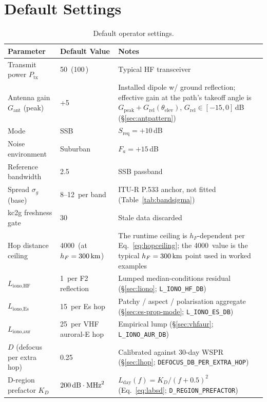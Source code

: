 \documentclass[11pt,a4paper]{article}
\newcommand{\SI}[2]{#1\,\text{#2}}
\newcommand{\si}[1]{\text{#1}}
\newcommand{\dB}{\text{dB}}
\newcommand{\dBm}{\text{dBm}}
\newcommand{\dBi}{\text{dBi}}
\newcommand{\MHz}{\text{MHz}}
\newcommand{\kHz}{\text{kHz}}
\newcommand{\km}{\text{km}}
\newcommand{\W}{\text{W}}
\newcommand{\minute}{\text{min}}
\begin{document}
\appendix

\section{Default Settings}\label{app:defaults}

\begin{table}[H]
\centering
\caption{Default operator settings.}
\label{tab:defaults}
\begin{tabular}{@{}lll@{}}
\toprule
\textbf{Parameter} & \textbf{Default Value} & \textbf{Notes} \\
\midrule
Transmit power $P_{\text{tx}}$ & \SI{50}{\dBm} (\SI{100}{\W}) & Typical HF transceiver \\
Antenna gain $G_{\text{ant}}$ (peak) & \SI{+5}{\dBi} & Installed dipole w/ ground reflection; effective gain at the path's takeoff angle is $G_{\text{peak}} + G_{\text{rel}}(\theta_{\text{elev}})$, $G_{\text{rel}} \in [-15, 0]$\,dB (\S\ref{sec:antpattern}) \\
Mode & SSB & $S_{\text{req}} = +10$\,dB \\
Noise environment & Suburban & $F_a = +15$\,dB \\
Reference bandwidth & \SI{2.5}{\kHz} & SSB passband \\
Spread $\sigma_g$ (base) & 8--12\,\si{\dB} per band & ITU-R P.533 anchor, not fitted (Table~\ref{tab:bandsigma}) \\
kc2g freshness gate & \SI{30}{\minute} & Stale data discarded \\
Hop distance ceiling & \SI{4000}{\km} (at $h_F = \SI{300}{\km}$) & The runtime ceiling is $h_F$-dependent per Eq.~\ref{eq:hopceiling}; the \SI{4000}{\km} value is the typical $h_F = \SI{300}{\km}$ point used in worked examples \\
$L_{\text{iono,HF}}$ & \SI{1}{\dB} per F2 reflection & Lumped median-conditions residual (\S\ref{sec:liono}; \texttt{L\_IONO\_HF\_DB}) \\
$L_{\text{iono,Es}}$ & \SI{15}{\dB} per Es hop & Patchy / aspect / polarisation aggregate (\S\ref{sec:es-prop-mode}; \texttt{L\_IONO\_ES\_DB}) \\
$L_{\text{iono,aur}}$ & \SI{25}{\dB} per VHF auroral-E hop & Empirical lump (\S\ref{sec:vhfaur}; \texttt{L\_IONO\_AUR\_DB}) \\
$D$ (defocus per extra hop) & \SI{0.25}{\dB} & Calibrated against 30-day WSPR (\S\ref{sec:lhop}; \texttt{DEFOCUS\_DB\_PER\_EXTRA\_HOP}) \\
D-region prefactor $K_D$ & $200\,\si{\dB}\cdot\si{\MHz}^{2}$ & $L_{\text{day}}(f) = K_D / (f + 0.5)^{2}$ (Eq.~\ref{eq:labsd}; \texttt{D\_REGION\_PREFACTOR}) \\
\bottomrule
\end{tabular}
\end{table}
\end{document}
